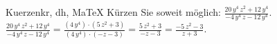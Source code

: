 \begin{MAufgabe}{Kuerzen}{kr, dh, MaTeX}
K\"urzen Sie soweit m\"oglich: $\frac{20\, y^4\, z^2 + 12\, y^4}{ - 4\, y^4\, z - 12\, y^4}$.\\ 
\ifLsg\MLoesung
\quad $\frac{20\, y^4\, z^2 + 12\, y^4}{ - 4\, y^4\, z - 12\, y^4}=\frac{(4\, y^4)\cdot(5\, z^2 + 3)}{(4\, y^4)\cdot( - z - 3)}=\frac{5\, z^2 + 3}{ - z - 3}=\frac{ - 5\, z^2 - 3}{z + 3}$.\else\relax\fi
 \end{MAufgabe}
